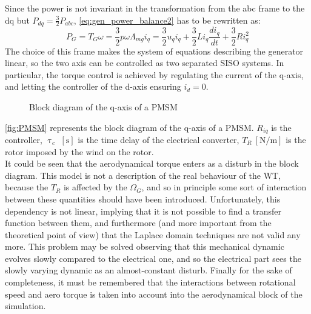 Since the power is not invariant in the transformation from the abc frame to the dq but $P_{dq} = \frac{3}{2}P_{abc}$, \autoref{eq:gen_power_balance2} has to be rewritten as:
\begin{equation}
  P_G = T_G\omega = \frac{3}{2}p\omega\Lambda_{mg}i_q = \frac{3}{2}u_qi_q + \frac{3}{2}L i_q\frac{di_q}{dt} + \frac{3}{2}R i_q^2
  \label{eq:gen_power_balance3}
\end{equation}
The choice of this frame makes the system of equations describing the generator linear, so the two axis can be controlled as two separated \acrfull{SISO} systems. In particular, the torque control is achieved by regulating the current of the q-axis, and letting the controller of the d-axis ensuring $i_d=0$.
\begin{figure}[htb]

\caption{Block diagram of the q-axis of a PMSM}
\label{fig:PMSM}
\end{figure}

\autoref{fig:PMSM} represents the block diagram of the q-axis of a \acrshort{PMSM}. $R_{iq}$ is the controller, $\uptau_{c}$ $\left[\si{\second}\right]$ is the time delay of the electrical converter, $T_R \ \left[\si{\newton \per \meter}\right]$ is the rotor imposed by the wind on the rotor.\\
It could be seen that the aerodynamical torque enters as a disturb in the block diagram. This model is not a description of the real behaviour of the \acrshort{WT}, because the $T_R$ is affected by the $\Omega_G$, and so in principle some sort of interaction between these quantities should have been introduced. Unfortunately, this dependency is not linear, implying that it is not possible to find a transfer function between them, and furthermore (and more important from the theoretical point of view) that the Laplace domain techniques are not valid any more. This problem may be solved observing that this mechanical dynamic evolves slowly compared to the electrical one, and so the electrical part sees the slowly varying dynamic as an almost-constant disturb. Finally for the sake of completeness, it must be remembered that the interactions between rotational speed and aero torque is taken into account into the aerodynamical block of the simulation. \\

